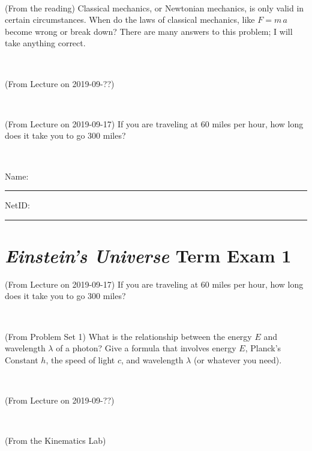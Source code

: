 \documentclass[12pt, letterpaper]{article}
\begin{document}
\vfill ~

\begin{problem} (From the reading)
Classical mechanics, or Newtonian mechanics, is only valid in certain
circumstances. When do the laws of classical mechanics, like $F =
m\,a$ become wrong or break down? There are many answers to this
problem; I will take anything correct.
\end{problem}


\vfill ~

\begin{problem} (From Lecture on 2019-09-??)
\end{problem}


\vfill ~

\begin{problem} (From Lecture on 2019-09-17)
If you are traveling at 60 miles per hour, how long does
it take you to go 300 miles?
\end{problem}


\vfill ~


\cleardoublepage



\noindent
Name: \rule[-1ex]{0.60\textwidth}{0.1pt}
NetID: \rule[-1ex]{0.20\textwidth}{0.1pt}

\section*{\textsl{Einstein's Universe} Term Exam 1}
\setcounter{problem}{1}


\begin{problem} (From Lecture on 2019-09-17)
If you are traveling at 60 miles per hour, how long does
it take you to go 300 miles?
\end{problem}


\vfill ~

\begin{problem} (From Problem Set 1)
What is the relationship between the energy $E$ and wavelength
$\lambda$ of a photon? Give a formula that involves energy $E$,
Planck's Constant $h$, the speed of light $c$, and wavelength
$\lambda$ (or whatever you need).
\end{problem}

\vfill ~

\begin{problem} (From Lecture on 2019-09-??)
\end{problem}


\vfill ~

\begin{problem} (From the Kinematics Lab)

\end{problem}
\end{document}
